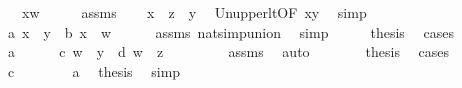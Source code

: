 \begin{isabellebody}
\ \ \ {\isachardoublequoteopen}x{\isacharless}{\kern0pt}w{\isachardoublequoteclose}\isanewline
%
\isadelimproof
%
\endisadelimproof
%
\isatagproof
{}\isamarkupfalse%
\ {\isacharminus}{\kern0pt}\isanewline
\ \ \isamarkupfalse%
\ assms\isanewline
\ \ \isamarkupfalse%
\ {\isachardoublequoteopen}x\ {\isacharless}{\kern0pt}\ z\ {\isasymunion}\ y{\isachardoublequoteclose}\ \isamarkupfalse%
\ Un{\isacharunderscore}{\kern0pt}upper{}{\isacharunderscore}{\kern0pt}lt{\isacharbrackleft}{\kern0pt}OF\ {\isacartoucheopen}x{\isacharless}{\kern0pt}y{\isacartoucheclose}{\isacharbrackright}{\kern0pt}\ \isamarkupfalse%
\ simp\isanewline
\ \ \isamarkupfalse%
\isanewline
\ \ \isamarkupfalse%
\ {\isacharparenleft}{\kern0pt}a{\isacharparenright}{\kern0pt}\ {\isachardoublequoteopen}x\ {\isacharless}{\kern0pt}\ y{\isachardoublequoteclose}\ {\isacharbar}{\kern0pt}\ {\isacharparenleft}{\kern0pt}b{\isacharparenright}{\kern0pt}\ {\isachardoublequoteopen}x\ {\isacharless}{\kern0pt}\ w{\isachardoublequoteclose}\isanewline
\ \ \ \ \isamarkupfalse%
\ assms\ nat{\isacharunderscore}{\kern0pt}simp{\isacharunderscore}{\kern0pt}union\ \isamarkupfalse%
\ simp\isanewline
\ \ \isamarkupfalse%
\ \isamarkupfalse%
\ {\isacharquery}{\kern0pt}thesis\ \isamarkupfalse%
\ {\isacharparenleft}{\kern0pt}cases{\isacharparenright}{\kern0pt}\isanewline
\ \ \ \ \isamarkupfalse%
\ a\isanewline
\ \ \ \ \isamarkupfalse%
\ {\isacharparenleft}{\kern0pt}c{\isacharparenright}{\kern0pt}\ {\isachardoublequoteopen}w\ {\isacharequal}{\kern0pt}\ y{\isachardoublequoteclose}\ {\isacharbar}{\kern0pt}\ {\isacharparenleft}{\kern0pt}d{\isacharparenright}{\kern0pt}\ {\isachardoublequoteopen}w\ {\isacharequal}{\kern0pt}\ z{\isachardoublequoteclose}\ \isanewline
\ \ \ \ \ \ \isamarkupfalse%
\ assms\ \isamarkupfalse%
\ auto\isanewline
\ \ \ \ \isamarkupfalse%
\ \isamarkupfalse%
\ {\isacharquery}{\kern0pt}thesis\ \isamarkupfalse%
\ {\isacharparenleft}{\kern0pt}cases{\isacharparenright}{\kern0pt}\isanewline
\ \ \ \ \ \ \isamarkupfalse%
\ c\isanewline
\ \ \ \ \ \ \isamarkupfalse%
\ a\ \isamarkupfalse%
\ {\isacharquery}{\kern0pt}thesis\ \isamarkupfalse%
\ simp\isanewline
\ \ \ \ \isamarkupfalse%
\isanewline

\end{isabellebody}
